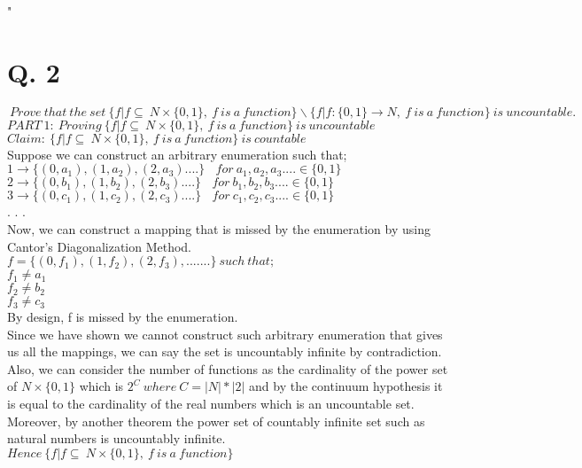 " \documentclass[10pt]{article}
\begin{document}
\section*{Q. 2}
\begin{equation*}
  \ Prove \ that \ the \ set \ \{f | f \subseteq \ N \times \{0, 1\}, \ f \ is \ a \ function\} \backslash \{f | f : \{0, 1\} \rightarrow  N, \ f \ is \ a \ function\} \ is \ uncountable.
  \end{equation*}
  $PART\ 1:  \ Proving \ \{f | f \subseteq \ N \times \{0, 1\}, \ f \ is \ a \ function\}  \ is \ uncountable$\\
 $ Claim: \ \{f | f \subseteq \ N \times \{0, 1\}, \ f \ is \ a \ function\} \ is \ countable$\\
 Suppose we can construct an arbitrary enumeration such that;\\
 $1 \rightarrow \{(0,a_1),(1,a_2),(2,a_3)....\} \ \ \ \ for \ a_1,a_2,a_3....  \in \{0,1\}$\\              
 $2 \rightarrow \{(0,b_1),(1,b_2),(2,b_3)....\} \ \ \ \ for \ b_1,b_2,b_3....  \in \{0,1\}$\\
 $3 \rightarrow \{(0,c_1),(1,c_2),(2,c_3)....\} \ \ \ \ for \ c_1,c_2,c_3....  \in \{0,1\}$\\
                               .
                               .
                               .\\
 Now, we can construct a mapping that is missed by the enumeration by using Cantor's Diagonalization Method.\\
 $f=\{(0,f_1),(1,f_2),(2,f_3),.......\} \ such \ that;$\\
 $f_1 \neq a_1$\\
 $f_2 \neq b_2$\\
 $f_3 \neq c_3$\\
 By design, f is missed by the enumeration.\\
 Since we have shown we cannot construct such arbitrary enumeration that gives us all the mappings, we can say the set is uncountably infinite by contradiction. \\ 
 Also, we can consider the number of functions as the cardinality of the power set of 
 $N \times \{0,1\}$
 which is
 $2^C \ where \ C=|N|*|2|$
and by the continuum hypothesis it is equal to the cardinality of the real numbers which is an uncountable set. Moreover, by another theorem the power set of countably infinite set such as natural numbers is uncountably infinite.\\
 $Hence \ \{f | f \subseteq \ N \times \{0, 1\}, \ f \ is \ a \ function\}$
\end{document}
